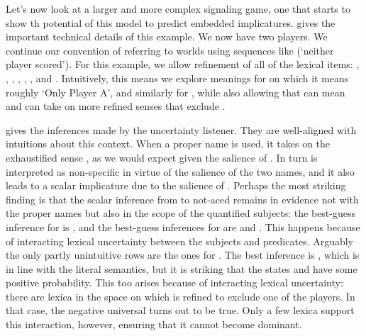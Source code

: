 \documentclass[leqno]{article}
\begin{document}
Let's now look at a larger and more complex signaling game, one that
starts to show th potential of this model to predict embedded
implicatures.  gives the important technical
details of this example. We now have two players. We continue our
convention of referring to worlds using sequences like 
(`neither player scored'). For this example, we allow refinement of
all of the lexical items: , ,
, , , , and .
Intuitively, this means we explore meanings for  on
which it means roughly `Only Player A', and similarly for , while also allowing that  can mean  and  can take on more refined senses that exclude
.



 gives the inferences made by the uncertainty
listener. They are well-aligned with intuitions about this context.
When a proper name  is used, it takes on the exhaustified
sense , as we would expect given the salience of
. In turn  is interpreted as non-specific in
virtue of the salience of the two names, and it also leads to a scalar
implicature due to the salience of . Perhaps the most
striking finding is that the scalar inference from  to
not-aced remains in evidence not with the proper names but also in the
scope of the quantified subjects: the best-guess inference for
 is , and the best-guess
inferences for  are  and
. This happens because of interacting lexical uncertainty
between the subjects and predicates. Arguably the only partly
unintuitive rows are the ones for .  The best
inference is , which is in line with the literal semantics,
but it is striking that the states  and  have some
positive probability. This too arises because of interacting lexical
uncertainty: there are lexica in the space on which  is
refined to exclude one of the players.  In that case, the negative
universal turns out to be true. Only a few lexica support this
interaction, however, ensuring that it cannot become dominant.

\end{document}
